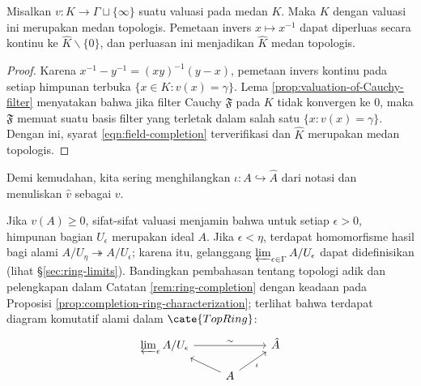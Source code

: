 \begin{proposition}\label{prop:completion-valued-field}
	Misalkan $v: K \to \Gamma \sqcup \{\infty\}$ suatu valuasi pada medan $K$. Maka $K$ dengan valuasi ini merupakan medan topologis. Pemetaan invers $x \mapsto x^{-1}$ dapat diperluas secara kontinu ke $\hat{K} \smallsetminus \{0\}$, dan perluasan ini menjadikan $\hat{K}$ medan topologis.
\end{proposition}
\begin{proof}
	Karena $x^{-1} - y^{-1} = (xy)^{-1}(y-x)$, pemetaan invers kontinu pada setiap himpunan terbuka $\{x \in K: v(x)=\gamma \}$. Lema \ref{prop:valuation-of-Cauchy-filter} menyatakan bahwa jika filter Cauchy $\mathfrak{F}$ pada $K$ tidak konvergen ke $0$, maka $\mathfrak{F}$ memuat suatu basis filter yang terletak dalam salah satu $\{x: v(x) = \gamma \}$. Dengan ini, syarat \eqref{eqn:field-completion} terverifikasi dan $\hat{K}$ merupakan medan topologis.
\end{proof}

Demi kemudahan, kita sering menghilangkan $\iota: A \hookrightarrow \hat{A}$ dari notasi dan menuliskan $\hat{v}$ sebagai $v$.
\begin{remark}
	Jika $v(A) \geq 0$, sifat-sifat valuasi menjamin bahwa untuk setiap $\epsilon > 0$, himpunan bagian $U_\epsilon$ merupakan ideal $A$. Jika $\epsilon < \eta$, terdapat homomorfisme hasil bagi alami $A/U_\eta \twoheadrightarrow A/U_\epsilon$; karena itu, gelanggang $\varprojlim_{\epsilon \in \Gamma} A/U_\epsilon$ dapat didefinisikan (lihat \S\ref{sec:ring-limits}). Bandingkan pembahasan tentang topologi adik dan pelengkapan dalam Catatan \ref{rem:ring-completion} dengan keadaan pada Proposisi \ref{prop:completion-ring-characterization}; terlihat bahwa terdapat diagram komutatif alami dalam $\cate{TopRing}$:
	\begin{equation}\label{eqn:completion-ring-via-ideals} \begin{tikzcd}[row sep=small]
		\varprojlim_\epsilon A/U_\epsilon \arrow[rr, "\sim"] & & \hat{A} \\
		{} & A \arrow[lu] \arrow[ru, "\iota"'] &
	\end{tikzcd}\end{equation}
\end{remark}

